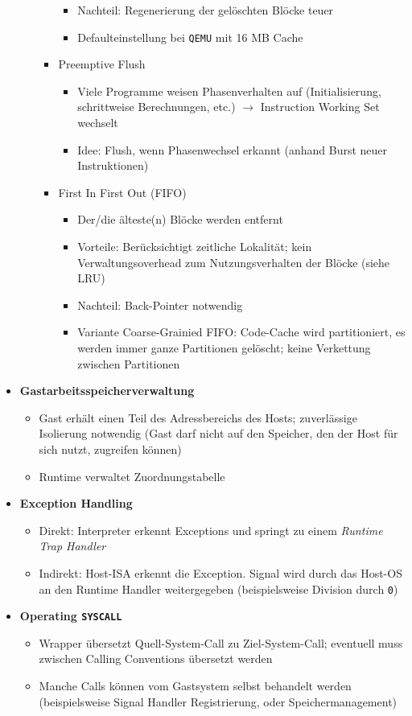 \begin{itemize}
\begin{itemize}
\begin{itemize}
\begin{itemize}
				\item Nachteil: Regenerierung der gelöschten Blöcke teuer
				\item Defaulteinstellung bei \texttt{QEMU} mit 16 MB Cache
			\end{itemize}
			\item Preemptive Flush
			\begin{itemize}
				\item Viele Programme weisen Phasenverhalten auf (Initialisierung, schrittweise Berechnungen, etc.) \(\rightarrow\) Instruction Working Set wechselt
				\item Idee: Flush, wenn Phasenwechsel erkannt (anhand Burst neuer Instruktionen)
			\end{itemize}
			\item First In First Out (FIFO)
			\begin{itemize}
				\item Der/die älteste(n) Blöcke werden entfernt
				\item Vorteile: Berücksichtigt zeitliche Lokalität; kein Verwaltungsoverhead zum Nutzungsverhalten der Blöcke (siehe LRU)
				\item Nachteil: Back-Pointer notwendig
				\item Variante Coarse-Grainied FIFO: Code-Cache wird partitioniert, es werden immer ganze Partitionen gelöscht; keine Verkettung zwischen Partitionen
			\end{itemize}
		\end{itemize}
	\end{itemize}
	\item \textbf{Gastarbeitsspeicherverwaltung}
	\begin{itemize}
		\item Gast erhält einen Teil des Adressbereichs des Hosts; zuverlässige Isolierung notwendig (Gast darf nicht auf den Speicher, den der Host für sich nutzt, zugreifen können)
		\item Runtime verwaltet Zuordnungstabelle
	\end{itemize}
	\item \textbf{Exception Handling}
	\begin{itemize}
		\item Direkt: Interpreter erkennt Exceptions und springt zu einem \textit{Runtime Trap Handler}
		\item Indirekt: Host-ISA erkennt die Exception. Signal wird durch das Host-OS an den Runtime Handler weitergegeben (beispielsweise Division durch \texttt{0})
	\end{itemize}
	\item \textbf{Operating \texttt{SYSCALL}}
	\begin{itemize}
		\item Wrapper übersetzt Quell-System-Call zu Ziel-System-Call; eventuell muss zwischen Calling Conventions übersetzt werden
		\item Manche Calls können vom Gastsystem selbst behandelt werden (beispielsweise Signal Handler Registrierung, oder Speichermanagement)
	\end{itemize}
\end{itemize}



